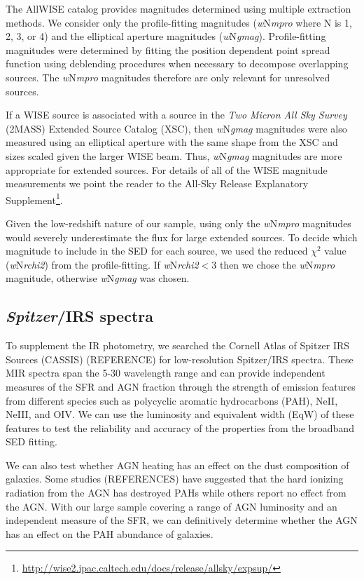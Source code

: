 \documentclass[fleqn, usenatbib]{mnras}
\begin{document}
The AllWISE catalog provides magnitudes determined using multiple extraction methods. We consider only the profile-fitting magnitudes (\textit{w}N\textit{mpro} where N is 1, 2, 3, or 4) and the elliptical aperture magnitudes (\textit{w}N\textit{gmag}). Profile-fitting magnitudes were determined by fitting the position dependent point spread function using deblending procedures when necessary to decompose overlapping sources. The \textit{w}N\textit{mpro} magnitudes therefore are only relevant for unresolved sources.

If a WISE source is associated with a source in the \textit{Two Micron All Sky Survey} (2MASS) Extended Source Catalog (XSC), then \textit{w}N\textit{gmag} magnitudes were also measured using an elliptical aperture with the same shape from the XSC and sizes scaled given the larger WISE beam. Thus, \textit{w}N\textit{gmag} magnitudes are more appropriate for extended sources. For details of all of the WISE magnitude measurements we point the reader to the All-Sky Release Explanatory Supplement\footnote{\url{http://wise2.ipac.caltech.edu/docs/release/allsky/expsup/}}.

Given the low-redshift nature of our sample, using only the \textit{w}N\textit{mpro} magnitudes would severely underestimate the flux for large extended sources. To decide which magnitude to include in the SED for each source, we used the reduced $\chi^{2}$ value (\textit{w}N\textit{rchi2}) from the profile-fitting. If \textit{w}N\textit{rchi2}$<3$ then we chose the \textit{w}N\textit{mpro} magnitude, otherwise \textit{w}N\textit{gmag} was chosen. 

\subsection{\emph{Spitzer}/IRS spectra}
To supplement the IR photometry, we searched the Cornell Atlas of Spitzer IRS Sources (CASSIS) (REFERENCE) for low-resolution Spitzer/IRS spectra. These MIR spectra span the 5-30 \micron{} wavelength range and can provide independent measures of the SFR and AGN fraction through the strength of emission features from different species such as polycyclic aromatic hydrocarbons (PAH), NeII, NeIII, and OIV. We can use the luminosity and equivalent width (EqW) of these features to test the reliability and accuracy of the properties from the broadband SED fitting. 

We can also test whether AGN heating has an effect on the dust composition of galaxies. Some studies (REFERENCES) have suggested that the hard ionizing radiation from the AGN has destroyed PAHs while others report no effect from the AGN. With our large sample covering a range of AGN luminosity and an independent measure of the SFR, we can definitively determine whether the AGN has an effect on the PAH abundance of galaxies.
\end{document}
